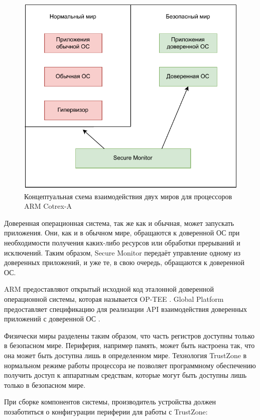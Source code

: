 \begin{figure}[h]
	\centering
	\includegraphics[width=\textwidth]{img/arm-conceptual.pdf}
	\caption{Концептуальная схема взаимодействия двух миров для процессоров ARM Cotrex-A}
	\label{fig:trustzone-conceptual}
\end{figure}

Доверенная операционная система, так же как и обычная, может запускать приложения. Они, как и в обычном мире, обращаются к доверенной ОС при необходимости получения каких-либо ресурсов или обработки прерываний и исключений. Таким образом, Secure Monitor передаёт управление одному из доверенных приложений, и уже те, в свою очередь, обращаются к доверенной ОС.

ARM предоставляют открытый исходной код эталонной доверенной операционной системы, которая называется OP-TEE \cite{optee}. Global Platform предоставляет спецификацию для реализации API взаимодействия доверенных приложений \cite{teec-spec} с доверенной ОС \cite{tee-spec}.

Физически миры разделены таким образом, что часть регистров доступны только в безопасном мире. Периферия, например память, может быть настроена так, что она может быть доступна лишь в определенном мире. Технология TrustZone в нормальном режиме работы процессора не позволяет программному обеспечению получить доступ к аппаратным средствам, которые могут быть доступны лишь только в безопасном мире. 

При сборке компонентов системы, производитель устройства должен позаботиться о конфигурации периферии для работы с TrustZone:

